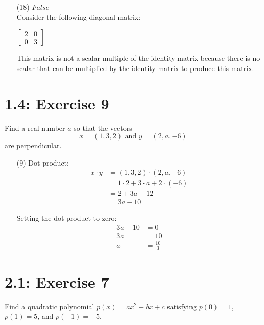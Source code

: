 \documentclass{report}
\begin{document}
\sol 

\begin{enumerate}
\item[(18)]     
$ \boxed{False}$ \\
Consider the following diagonal matrix:

$
\begin{bmatrix}
2 & 0 \\
0 & 3
\end{bmatrix}
$

This matrix is not a scalar multiple of the identity matrix because there is no scalar that can be multiplied by the identity matrix to produce this matrix.
\end{enumerate}


\section*{1.4: Exercise 9} 

Find a real number $a$ so that the vectors
\[
x = (1,3,2) \text{ and } y = (2,a,-6)
\]
are perpendicular.\\


\sol 

\begin{enumerate}
\item[(9)]     
Dot product:
\begin{align*}
x \cdot y &= (1,3,2) \cdot (2,a,-6) \\
&= 1 \cdot 2 + 3 \cdot a + 2 \cdot (-6) \\
&= 2 + 3a - 12 \\
&= 3a - 10
\end{align*}

Setting the dot product to zero:
\begin{align*}
3a - 10 &= 0 \\
3a &= 10 \\
a &= \boxed{\frac{10}{3}}
\end{align*}
\end{enumerate}





\section*{2.1: Exercise 7} 

Find a quadratic polynomial $p(x) = ax^2 + bx + c$
  satisfying $p(0) = 1$, $p(1) = 5$, and $p(-1) = -5$.
\end{document}
